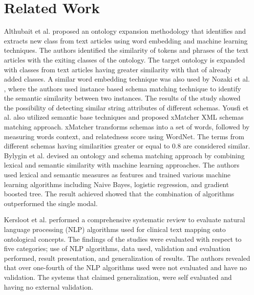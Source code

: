 
\section*{Related Work}
Althubait et al. \cite{althubaiti2020combining} proposed an ontology expansion methodology that identifies and extracts new class from text articles using word embedding and machine learning techniques. The authors identified the similarity of tokens and phrases of the text articles with the exiting classes of the ontology. The target ontology is expanded with classes from text articles having greater similarity with that of already added classes. A similar word embedding technique was also used by Nozaki et al. \cite{nozaki2019semantic}, where the authors used instance based schema matching technique to identify the semantic similarity between two instances. The results of the study showed the possibility of detecting similar string attributes of different schemas. Yousfi et al. \cite{yousfi2020xmatcher} also utilized semantic base techniques and proposed xMatcher XML schemas matching approach. xMatcher transforms schemas into a set of words, followed by measuring words context, and relatedness score using WordNet. The terms from different schemas having similarities greater or equal to 0.8 are considered similar. 
Bylygin et al. \cite{bulygin2018combining} devised an ontology and schema matching approach by combining lexical and semantic similarity with machine learning approaches.  The authors used lexical and semantic measures as features and trained various machine learning algorithms including Naive Bayes, logistic regression, and gradient boosted tree. The result achieved showed that the combination of algorithms outperformed the single modal. 

Kersloot et al. \cite{kersloot2020natural} performed a comprehensive systematic review to evaluate natural language processing (NLP) algorithms used for clinical text mapping onto ontological concepts. The findings of the studies were evaluated with respect to five categories; use of NLP algorithms, data used, validation and evaluation performed, result presentation, and generalization of results. The authors revealed that over one-fourth of the NLP algorithms used were not evaluated and have no validation. The systems that claimed generalization, were self evaluated and having no external validation.  
